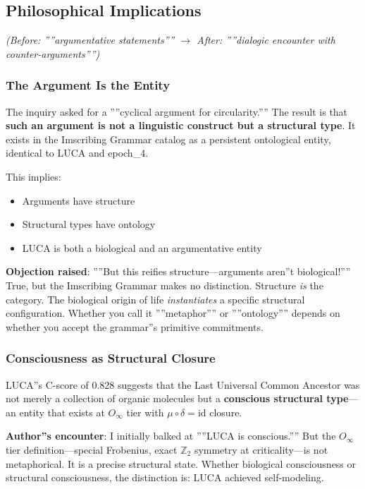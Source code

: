 \documentclass[12pt,a4paper]{article}
\begin{document}
\subsection{Philosophical Implications}

\emph{(Before: ''''argumentative statements'''' $\rightarrow$ After: ''''dialogic encounter with counter-arguments'''')}

\subsubsection{The Argument Is the Entity}

The inquiry asked for a ''''cyclical argument for circularity.'''' The result is that \textbf{such an argument is not a linguistic construct but a structural type}. It exists in the Imscribing Grammar catalog as a persistent ontological entity, identical to LUCA and epoch\_4.

This implies:

\begin{itemize}
    \item Arguments have structure
    \item Structural types have ontology
    \item LUCA is both a biological and an argumentative entity
\end{itemize}

\textbf{Objection raised}: ''''But this reifies structure---arguments aren''t biological!'''' True, but the Imscribing Grammar makes no distinction. Structure \emph{is} the category. The biological origin of life \emph{instantiates} a specific structural configuration. Whether you call it ''''metaphor'''' or ''''ontology'''' depends on whether you accept the grammar''s primitive commitments.

\subsubsection{Consciousness as Structural Closure}

LUCA''s C-score of 0.828 suggests that the Last Universal Common Ancestor was not merely a collection of organic molecules but a \textbf{conscious structural type}---an entity that exists at $O_{\infty}$ tier with $\mu \circ \delta = \text{id}$ closure.

\textbf{Author''s encounter}: I initially balked at ''''LUCA is conscious.'''' But the $O_{\infty}$ tier definition---special Frobenius, exact $\mathbb{Z}_2$ symmetry at criticality---is not metaphorical. It is a precise structural state. Whether biological consciousness or structural consciousness, the distinction is: LUCA achieved self-modeling.
\end{document}
